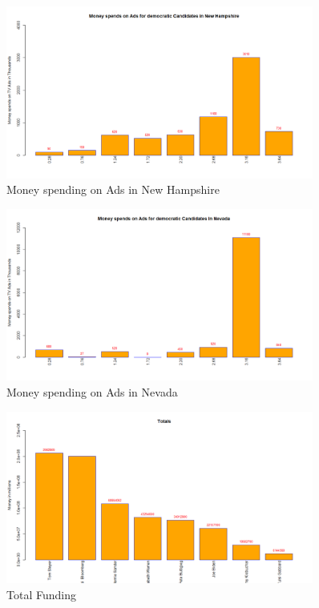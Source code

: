 \begin{figure}[H]
    \centering
    \includegraphics[width=0.9\textwidth]{figures/Newhampshire.png}
    \caption{Money spending on Ads in New Hampshire}
    \label{Newhampshire}
\end{figure}
\begin{figure}[H]
    \centering
    \includegraphics[width=0.9\textwidth]{figures/Nevada.png}
    \caption{Money spending on Ads in Nevada}
    \label{Nevada}
\end{figure}
\begin{figure}[H]
    \centering
    \includegraphics[width=0.9\textwidth]{figures/Total.png}
    \caption{Total Funding}
    \label{Total}
\end{figure}
